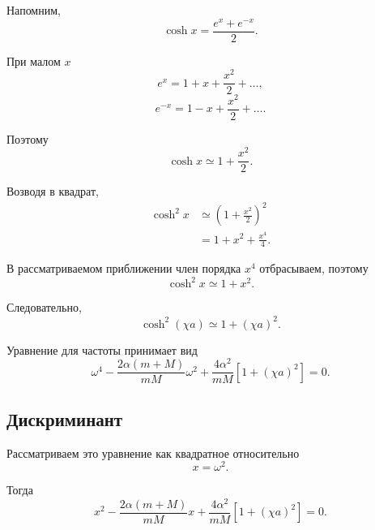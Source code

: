 \documentclass[../final.tex]{subfiles}
\begin{document}
Напомним,
%
\begin{equation*}
    \cosh x
    =
    \frac{e^x+e^{-x}}{2}.
\end{equation*}
%

При малом $x$
%
\begin{equation*}
    e^x
    =
    1+x+\frac{x^2}{2}+\ldots,
\end{equation*}
%
\begin{equation*}
    e^{-x}
    =
    1-x+\frac{x^2}{2}+\ldots.
\end{equation*}
%

Поэтому
%
\begin{equation*}
    \cosh x
    \simeq
    1+\frac{x^2}{2}.
\end{equation*}
%

Возводя в квадрат,
%
\begin{align*}
    \cosh^2x
    &\simeq
    \left(
        1+\frac{x^2}{2}
    \right)^2
    \\
    &=
    1+x^2+\frac{x^4}{4}.
\end{align*}
%

В рассматриваемом приближении член порядка $x^4$
отбрасываем, поэтому
%
\begin{equation*}
    \cosh^2x
    \simeq
    1+x^2.
\end{equation*}
%

Следовательно,
%
\begin{equation*}
    \cosh^2(\chi a)
    \simeq
    1+(\chi a)^2.
\end{equation*}
%

Уравнение для частоты принимает вид
%
\begin{equation*}
    \omega^4
    -
    \frac{2\alpha(m+M)}{mM}\omega^2
    +
    \frac{4\alpha^2}{mM}
    \left[
        1+(\chi a)^2
    \right]
    =
    0.
\end{equation*}



\subsection*{Дискриминант}

Рассматриваем это уравнение как квадратное
относительно
%
\begin{equation*}
    x=\omega^2.
\end{equation*}
%

Тогда
%
\begin{equation*}
    x^2
    -
    \frac{2\alpha(m+M)}{mM}x
    +
    \frac{4\alpha^2}{mM}
    \left[
        1+(\chi a)^2
    \right]
    =
    0.
\end{equation*}
%
\end{document}
